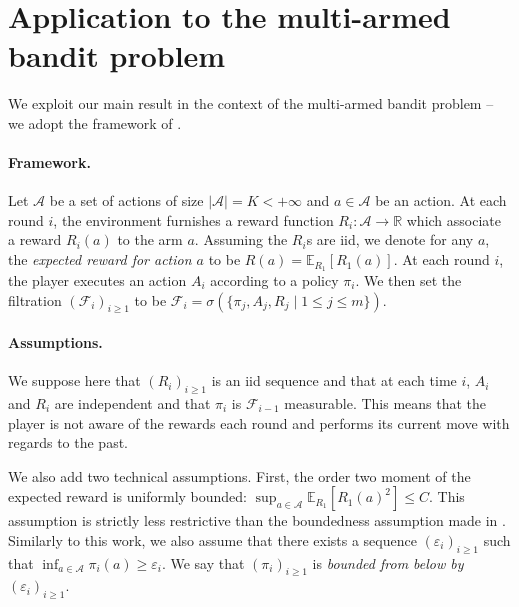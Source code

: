 \section{Application to the multi-armed bandit problem}
\label{sec: bandit}

We exploit our main result in the context of the multi-armed bandit problem -- we adopt the framework of \citet{seldin2012bandit}.

\paragraph{Framework.} Let $\mathcal{A}$ be a set of actions of size $|\mathcal{A}|=K<+\infty$ and $a\in\mathcal{A}$ be an action. At each round $i$, the environment furnishes a reward function $R_i:\mathcal{A}\rightarrow \mathbb{R}$ which associate a reward $R_i(a)$ to the arm $a$. Assuming the $R_i$s are iid, we denote for any $a$, the \emph{expected reward for action $a$} to be $R(a)= \mathbb{E}_{R_1}[R_1(a)]$.
At each round $i$, the player executes an action $A_i$ according to a policy $\pi_i$. We then set the filtration $(\mathcal{F}_i)_{i\geq 1}$ to be $\mathcal{F}_i = \sigma\left( \{\pi_j,A_j,R_j \mid 1\leq j\leq m\}    \right)$.


\paragraph{Assumptions.}We suppose here that $(R_i)_{i\geq 1}$ is an iid sequence and that at each time $i$, $A_i$ and $R_i$ are independent and that $\pi_i$ is $\mathcal{F}_{i-1}$ measurable. This means that the player is not aware of the rewards each round and performs its current move with regards to the past.

We also add two technical assumptions. First, the order two moment of the expected reward is uniformly bounded: $\sup_{a\in\mathcal{A}} \mathbb{E}_{R_1}[R_1(a)^2] \leq C$. This assumption is strictly less restrictive than the boundedness assumption made in \cite{seldin2012bandit}. Similarly to this work, we also assume that there exists a sequence $(\varepsilon_i)_{i\geq 1}$ such that $\inf_{a\in\mathcal{A}} \pi_i(a) \geq \varepsilon_i$.
We say that $(\pi_i)_{i\geq 1}$ is \emph{bounded from below by} $(\varepsilon_i)_{i\geq 1}$.


